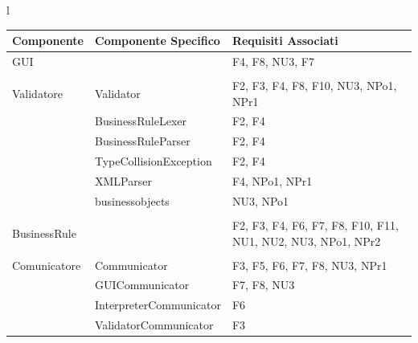 \documentclass[11pt,titlepage,a4paper]{report}
\begin{document}
\begin{center}
\begin{table}[hbtp]
\large{
\begin{tabular}{l}
\begin{tabular}{||p{3cm}||p{5cm}||p{6cm}||} \hline
\textbf{Componente} & \textbf{Componente Specifico} & \textbf{Requisiti Associati} \\ \hline

GUI & & F4, F8, NU3, F7\\ \hline
 &  & \\ \hline

Validatore & Validator & F2, F3, F4, F8, F10, NU3, NPo1, NPr1\\ \hline
 & BusinessRuleLexer & F2, F4 \\ \hline
 & BusinessRuleParser & F2, F4 \\ \hline
 & TypeCollisionException & F2, F4\\ \hline
 & XMLParser & F4, NPo1, NPr1\\ \hline
 & businessobjects & NU3, NPo1\\ \hline
 &  & \\ \hline

BusinessRule & & F2, F3, F4, F6, F7, F8, F10, F11, NU1, NU2, NU3, NPo1, NPr2\\ \hline
 &  & \\ \hline

Comunicatore & Communicator & F3, F5, F6, F7, F8, NU3, NPr1\\ \hline
 & GUICommunicator & F7, F8, NU3\\ \hline
 & InterpreterCommunicator & F6\\ \hline
 & ValidatorCommunicator & F3\\ \hline


\end{tabular} \\
\end{tabular}

}
\end{table}
\end{center}
\end{document}
